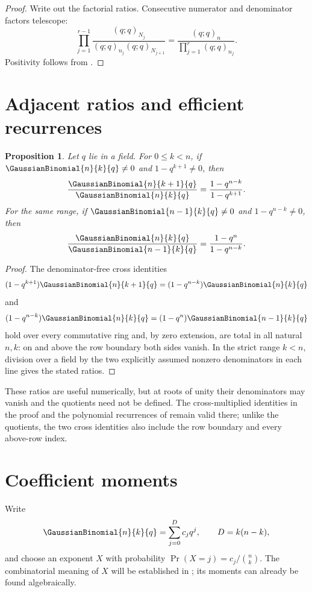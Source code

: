 \documentclass[11pt,a4paper,oneside,openany]{book}
\newtheorem{proposition}[proposition]{Proposition}
\theoremstyle{definition}
\theoremstyle{remark}
\begin{document}
\begin{proof}
Write out the factorial ratios.  Consecutive numerator and denominator factors telescope:
\[
 \prod_{j=1}^{r-1}
 \frac{(q;q)_{N_j}}{(q;q)_{n_j}(q;q)_{N_{j+1}}}
 =\frac{(q;q)_n}{\prod_{j=1}^{r}(q;q)_{n_j}}.
\]
Positivity follows from .
\end{proof}

\section{Adjacent ratios and efficient recurrences}

\begin{proposition}\label{prop:adjacent-ratio}
Let $q$ lie in a field.  For $0\le k<n$, if
$\GaussianBinomial{n}{k}{q}\ne0$ and $1-q^{k+1}\ne0$, then
\[
 \frac{\GaussianBinomial{n}{k+1}{q}}{\GaussianBinomial{n}{k}{q}}
 =\frac{1-q^{n-k}}{1-q^{k+1}}.
\]
For the same range, if $\GaussianBinomial{n-1}{k}{q}\ne0$ and
$1-q^{n-k}\ne0$, then
\[
 \frac{\GaussianBinomial{n}{k}{q}}{\GaussianBinomial{n-1}{k}{q}}
 =\frac{1-q^n}{1-q^{n-k}}.
\]
\end{proposition}

\begin{proof}
The denominator-free cross identities
\[
 (1-q^{k+1})\GaussianBinomial{n}{k+1}{q}
 =(1-q^{n-k})\GaussianBinomial{n}{k}{q}
\]
and
\[
 (1-q^{n-k})\GaussianBinomial{n}{k}{q}
 =(1-q^n)\GaussianBinomial{n-1}{k}{q}
\]
hold over every commutative ring and, by zero extension, are total in all
natural \(n,k\): on and above the row boundary both sides vanish.  In the
strict range \(k<n\), division over a field by the two explicitly assumed
nonzero denominators in each line gives the stated ratios.
\end{proof}

These ratios are useful numerically, but at roots of unity their denominators
may vanish and the quotients need not be defined.  The cross-multiplied
identities in the proof and the polynomial recurrences of
 remain valid there; unlike the quotients, the two cross
identities also include the row boundary and every above-row index.

\section{Coefficient moments}

Write
\[
 \GaussianBinomial{n}{k}{q}=\sum_{j=0}^{D}c_jq^j,
 \qquad D=k(n-k),
\]
and choose an exponent $X$ with probability
\(
 \Pr(X=j)=c_j/\binom nk.
\)
The combinatorial meaning of $X$ will be established in ; its moments can already be found algebraically.
\end{document}
